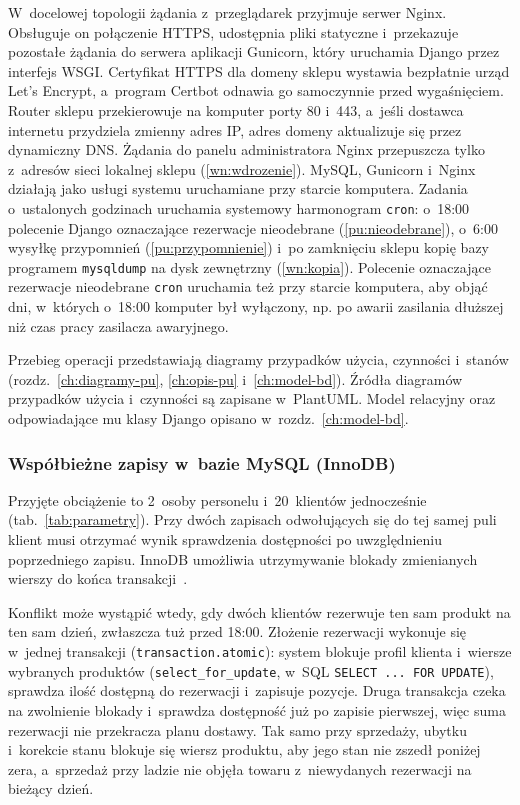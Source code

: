 \documentclass[12pt,a4paper,oneside]{article}
\newcounter{pu}
\begin{document}
W~docelowej topologii żądania z~przeglądarek przyjmuje serwer Nginx. Obsługuje on połączenie HTTPS, udostępnia pliki statyczne i~przekazuje pozostałe żądania do serwera aplikacji Gunicorn, który uruchamia Django przez interfejs WSGI. Certyfikat HTTPS dla domeny sklepu wystawia bezpłatnie urząd Let's Encrypt, a~program Certbot odnawia go samoczynnie przed wygaśnięciem. Router sklepu przekierowuje na komputer porty 80 i~443, a~jeśli dostawca internetu przydziela zmienny adres IP, adres domeny aktualizuje się przez dynamiczny DNS. Żądania do panelu administratora Nginx przepuszcza tylko z~adresów sieci lokalnej sklepu (\ref{wn:wdrozenie}). MySQL, Gunicorn i~Nginx działają jako usługi systemu uruchamiane przy starcie komputera. Zadania o~ustalonych godzinach uruchamia systemowy harmonogram \texttt{cron}: o~18:00 polecenie Django oznaczające rezerwacje nieodebrane (\ref{pu:nieodebrane}), o~6:00 wysyłkę przypomnień (\ref{pu:przypomnienie}) i~po zamknięciu sklepu kopię bazy programem \texttt{mysqldump} na dysk zewnętrzny (\ref{wn:kopia}). Polecenie oznaczające rezerwacje nieodebrane \texttt{cron} uruchamia też przy starcie komputera, aby objąć dni, w~których o~18:00 komputer był wyłączony, np. po awarii zasilania dłuższej niż czas pracy zasilacza awaryjnego.

Przebieg operacji przedstawiają diagramy przypadków użycia, czynności i~stanów (rozdz.~\ref{ch:diagramy-pu}, \ref{ch:opis-pu} i~\ref{ch:model-bd}). Źródła diagramów przypadków użycia i~czynności są zapisane w~PlantUML. Model relacyjny oraz odpowiadające mu klasy Django opisano w~rozdz.~\ref{ch:model-bd}.

\subsubsection{Współbieżne zapisy w~bazie MySQL (InnoDB)}
\label{sec:wspolbieznosc}

Przyjęte obciążenie to 2~osoby personelu i~20~klientów jednocześnie (tab.~\ref{tab:parametry}). Przy dwóch zapisach odwołujących się do tej samej puli klient musi otrzymać wynik sprawdzenia dostępności po uwzględnieniu poprzedniego zapisu. InnoDB umożliwia utrzymywanie blokady zmienianych wierszy do końca transakcji~\cite{mysql-blokady}.

Konflikt może wystąpić wtedy, gdy dwóch klientów rezerwuje ten sam produkt na ten sam dzień, zwłaszcza tuż przed 18:00. Złożenie rezerwacji wykonuje się w~jednej transakcji (\texttt{transaction.atomic}): system blokuje profil klienta i~wiersze wybranych produktów (\texttt{select\_for\_update}, w~SQL \texttt{SELECT ... FOR UPDATE}), sprawdza ilość dostępną do rezerwacji i~zapisuje pozycje. Druga transakcja czeka na zwolnienie blokady i~sprawdza dostępność już po zapisie pierwszej, więc suma rezerwacji nie przekracza planu dostawy. Tak samo przy sprzedaży, ubytku i~korekcie stanu blokuje się wiersz produktu, aby jego stan nie zszedł poniżej zera, a~sprzedaż przy ladzie nie objęła towaru z~niewydanych rezerwacji na bieżący dzień.
\end{document}
